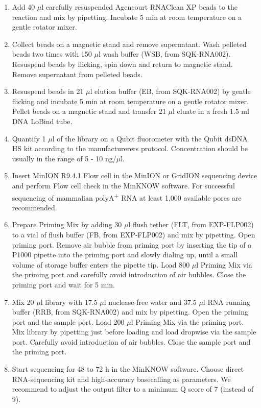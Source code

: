 \documentclass[times, 11pt, a4paper]{article}
\begin{document}
\begin{enumerate}
\item Add 40 $\mu$l carefully resuspended Agencourt RNAClean XP beads to the reaction and mix by pipetting. Incubate 5 min at room temperature on a gentle rotator mixer.

\item Collect beads on a magnetic stand and remove supernatant. Wash pelleted beads two times with 150 $\mu$l wash buffer (WSB, from SQK-RNA002). Resuspend beads by flicking, spin down and return to magnetic stand. Remove supernatant from pelleted beads.

\item Resuspend beads in 21 $\mu$l elution buffer (EB, from SQK-RNA002) by gentle flicking and incubate 5 min at room temperature on a gentle rotator mixer. Pellet beads on a magnetic stand and transfer 21 $\mu$l eluate in a fresh 1.5 ml DNA LoBind tube.

\item Quantify 1 $\mu$l of the library on a Qubit fluorometer with the Qubit dsDNA HS kit according to the manufacturerers protocol. Concentration should be usually in the range of 5 - 10 ng/$\mu$l.

\item Insert MinION R9.4.1 Flow cell in the MinION or GridION sequencing device and perform Flow cell check in the MinKNOW software. For successful sequencing of mammalian polyA\textsuperscript{+} RNA at least 1,000 available pores are recommended.

\item Prepare Priming Mix by adding 30 $\mu$l flush tether (FLT, from EXP-FLP002) to a vial of flush buffer (FB, from EXP-FLP002) and mix by pipetting. Open priming port. Remove air bubble from priming port by inserting the tip of a P1000 pipette into the priming port and slowly dialing up, until a small volume of storage buffer enters the pipette tip. Load 800 $\mu$l Priming Mix via the priming port and carefully avoid introduction of air bubbles. Close the priming port and wait for 5 min.

\item Mix 20 $\mu$l library with 17.5 $\mu$l nuclease-free water and 37.5 $\mu$l RNA running buffer (RRB, from SQK-RNA002) and mix by pipetting. Open the priming port and the sample port. Load 200 $\mu$l Priming Mix via the priming port. Mix library by pipetting just before loading and load dropwise via the sample port. Carefully avoid introduction of air bubbles. Close the sample port and the priming port.

\item Start sequencing for 48 to 72 h in the MinKNOW software. Choose direct RNA-sequencing kit and high-accuracy basecalling as parameters. We recommend to adjust the output filter to a minimum Q score of 7 (instead of 9).

\end{enumerate}
\end{document}
